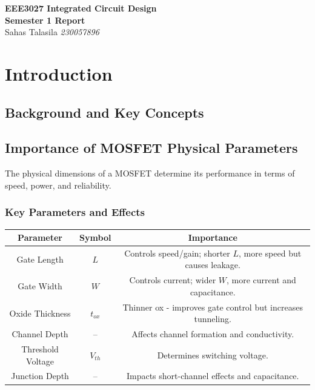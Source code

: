 \documentclass[a4paper,12pt]{article}
\begin{document}
\begin{titlepage}
    \centering
    \vspace*{2cm}
    \Huge{\textbf{EEE3027 Integrated Circuit Design}}\\[0.5cm]
    \Large{\textbf{Semester 1 Report}}\\ 
    \Large{Sahas Talasila \textit{230057896}}
    \vfill
\end{titlepage}

\tableofcontents
\newpage

\begin{abstract}
    This is a placeholder for the abstract of the report.
\end{abstract}

\section{Introduction}

\subsection{Background and Key Concepts}


\subsection{Importance of MOSFET Physical Parameters}

The physical dimensions of a MOSFET determine its performance in terms of speed, power, and reliability.

\subsubsection{Key Parameters and Effects}
\begin{center}
\begin{tabular}{|c|c|c|}
\hline
\textbf{Parameter} & \textbf{Symbol} & \textbf{Importance} \\
\hline
Gate Length & $L$ & Controls speed/gain; shorter $L$, more speed but causes leakage. \\
Gate Width & $W$ & Controls current; wider $W$, more current and capacitance. \\
Oxide Thickness & $t_{ox}$ & Thinner ox - improves gate control but increases tunneling. \\
Channel Depth & -- & Affects channel formation and conductivity. \\
Threshold Voltage & $V_{th}$ & Determines switching voltage. \\
Junction Depth & -- & Impacts short-channel effects and capacitance. \\
\hline
\end{tabular}
\end{center}
\end{document}
